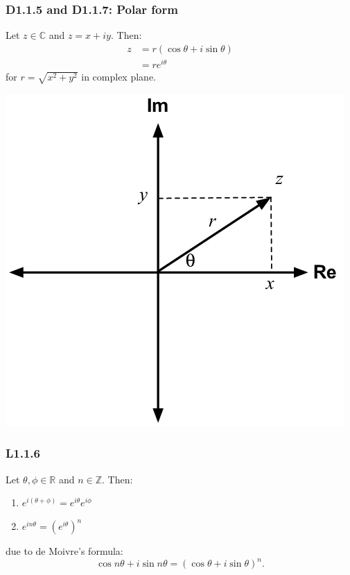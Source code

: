 \documentclass{article}
\begin{document}
\begin{multicols*}{3}
\subsubsection*{D1.1.5 and D1.1.7: Polar form}
Let $z\in\mathbb{C}$ and $z=x+iy$. Then:
\begin{align*}
    z
    &=r(\cos\theta+i\sin\theta) \\
    &=re^{i\theta}
\end{align*}
for $r=\sqrt{x^2+y^2}$ in complex plane.
\begin{center}
    \includegraphics[scale=0.2]{f0.png}
\end{center}

\subsubsection*{L1.1.6}
Let $\theta,\phi\in\mathbb{R}$ and $n\in\mathbb{Z}$. Then:
\begin{enumerate}
    \item $e^{i(\theta+\phi)}=e^{i\theta}e^{i\phi}$
    
    \item $e^{in\theta}=(e^{i\theta})^n$
\end{enumerate}
due to de Moivre's formula:
$$\cos n\theta+i\sin n\theta=(\cos \theta+i\sin \theta)^n.$$

\newcolumn


\end{multicols*}
\end{document}
